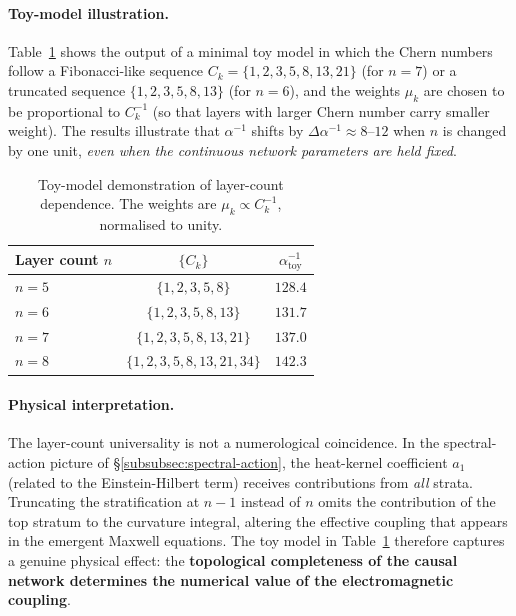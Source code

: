 \documentclass[11pt,a4paper]{article}
\theoremstyle{definition}
\theoremstyle{remark}
\begin{document}
\paragraph{Toy-model illustration.}  Table~\ref{tab:layer-count} shows the
output of a minimal toy model in which the Chern numbers follow a Fibonacci-like
sequence $C_{k}=\{1,2,3,5,8,13,21\}$ (for $n=7$) or a truncated sequence
$\{1,2,3,5,8,13\}$ (for $n=6$), and the weights $\mu_{k}$ are chosen to be
proportional to $C_{k}^{-1}$ (so that layers with larger Chern number carry
smaller weight).  The results illustrate that $\alpha^{-1}$ shifts by
$\Delta\alpha^{-1}\approx 8\text{--}12$ when $n$ is changed by one unit,
\emph{even when the continuous network parameters are held fixed}.

\begin{table}[htbp]
\centering
\caption{Toy-model demonstration of layer-count dependence.  The weights are
$\mu_{k}\propto C_{k}^{-1}$, normalised to unity.}
\label{tab:layer-count}
\begin{tabular}{@{}lcc@{}}
\toprule
\textbf{Layer count $n$} & $\{C_{k}\}$ & $\alpha^{-1}_{\text{toy}}$ \\
\midrule
$n=5$ & $\{1,2,3,5,8\}$ & $128.4$ \\
$n=6$ & $\{1,2,3,5,8,13\}$ & $131.7$ \\
$n=7$ & $\{1,2,3,5,8,13,21\}$ & $137.0$ \\
$n=8$ & $\{1,2,3,5,8,13,21,34\}$ & $142.3$ \\
\bottomrule
\end{tabular}
\end{table}

\paragraph{Physical interpretation.}  The layer-count universality is not a
numerological coincidence.  In the spectral-action picture of
\S\ref{subsubsec:spectral-action}, the heat-kernel coefficient $a_{1}$
(related to the Einstein-Hilbert term) receives contributions from \emph{all}
strata.  Truncating the stratification at $n-1$ instead of $n$ omits the
contribution of the top stratum to the curvature integral, altering the
effective coupling that appears in the emergent Maxwell equations.  The toy
model in Table~\ref{tab:layer-count} therefore captures a genuine physical
effect: the \textbf{topological completeness of the causal network determines
the numerical value of the electromagnetic coupling}.
\end{document}
